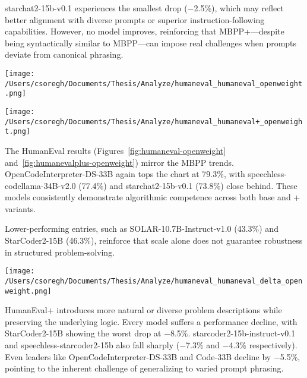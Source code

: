 starchat2-15b-v0.1 experiences the smallest drop (−2.5\%), which may reflect better alignment with diverse prompts or superior instruction-following capabilities. However, no model improves, reinforcing that MBPP+—despite being syntactically similar to MBPP—can impose real challenges when prompts deviate from canonical phrasing.

\begin{center}
	\texttt{[image: /Users/csoregh/Documents/Thesis/Analyze/humaneval\_humaneval\_openweight.png]}
	\label{fig:humaneval-openweight}
\end{center}

\begin{center}
	\texttt{[image: /Users/csoregh/Documents/Thesis/Analyze/humaneval\_humaneval+\_openweight.png]}
	\label{fig:humanevalplus-openweight}
\end{center}

The HumanEval results (Figures~\ref{fig:humaneval-openweight} and~\ref{fig:humanevalplus-openweight}) mirror the MBPP trends. OpenCodeInterpreter-DS-33B again tops the chart at 79.3\%, with speechless-codellama-34B-v2.0 (77.4\%) and starchat2-15b-v0.1 (73.8\%) close behind. These models consistently demonstrate algorithmic competence across both base and + variants.

Lower-performing entries, such as SOLAR-10.7B-Instruct-v1.0 (43.3\%) and StarCoder2-15B (46.3\%), reinforce that scale alone does not guarantee robustness in structured problem-solving.

\begin{center}
	\texttt{[image: /Users/csoregh/Documents/Thesis/Analyze/humaneval\_humaneval\_delta\_openweight.png]}
	\label{fig:humaneval-delta-openweight}
\end{center}

HumanEval+ introduces more natural or diverse problem descriptions while preserving the underlying logic. Every model suffers a performance decline, with StarCoder2-15B showing the worst drop at −8.5\%. starcoder2-15b-instruct-v0.1 and speechless-starcoder2-15b also fall sharply (−7.3\% and −4.3\% respectively). Even leaders like OpenCodeInterpreter-DS-33B and Code-33B decline by −5.5\%, pointing to the inherent challenge of generalizing to varied prompt phrasing.

